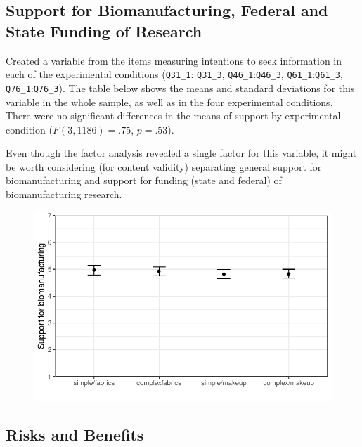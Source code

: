 \documentclass[
]{article}
\begin{document}
\hypertarget{support-for-biomanufacturing-federal-and-state-funding-of-research}{%
\subsection{Support for Biomanufacturing, Federal and State Funding of
Research}\label{support-for-biomanufacturing-federal-and-state-funding-of-research}}

Created a variable from the items measuring intentions to seek
information in each of the experimental conditions (\texttt{Q31\_1}:
\texttt{Q31\_3}, \texttt{Q46\_1}:\texttt{Q46\_3},
\texttt{Q61\_1}:\texttt{Q61\_3}, \texttt{Q76\_1}:\texttt{Q76\_3}). The
table below shows the means and standard deviations for this variable in
the whole sample, as well as in the four experimental conditions. There
were no significant differences in the means of support by experimental
condition (\(F(3, 1186) = .75\), \(p = .53\)).

Even though the factor analysis revealed a single factor for this
variable, it might be worth considering (for content validity)
separating general support for biomanufacturing and support for funding
(state and federal) of biomanufacturing research.

\begin{figure}

{\centering \includegraphics{BioMADE-fall2025-data-analysis_files/figure-pdf/support-1.pdf}

}

\end{figure}

\hypertarget{risks-and-benefits}{%
\subsection{Risks and Benefits}\label{risks-and-benefits}}
\end{document}
